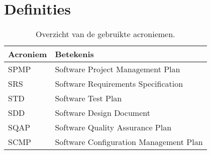 \chapter{Definities}
\begin{table} [H]
    \centering
    \caption{Overzicht van de gebruikte acroniemen.}
\begin{tabular}{l|l}
    Acroniem & Betekenis \\
    \hline
    SPMP & Software Project Management Plan \\
    SRS & Software Requirements Specification \\
    STD & Software Test Plan \\
    SDD & Software Design Document \\
    SQAP & Software Quality Assurance Plan \\
    SCMP & Software Configuration Management Plan
\end{tabular}
\end{table}